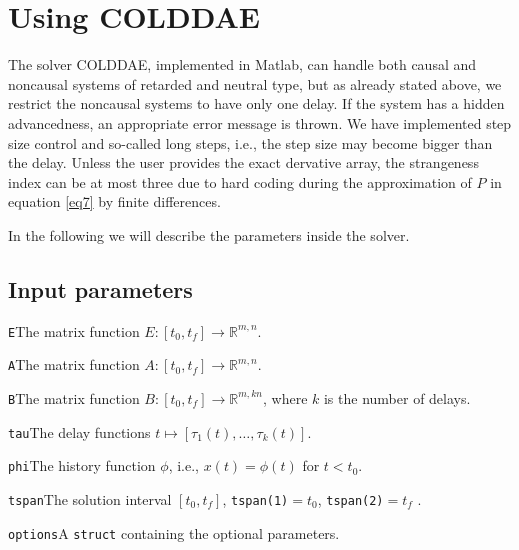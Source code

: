\documentclass[final,reqno]{siamltex}
\renewenvironment{itemize}[1]{\begin{compactitem}#1}{\end{compactitem}}
\begin{document}
\section{Using COLDDAE}

The solver COLDDAE, implemented in Matlab, can handle both causal and noncausal systems of retarded and neutral type, but as already stated above, we restrict the noncausal systems to have only one delay. If the system has a hidden advancedness, an appropriate error message is thrown.
We have implemented step size control and so-called long steps, i.e.,  the step size may become bigger than the delay. 
Unless the user provides the exact dervative array, the strangeness index can be at most three due to hard coding during the approximation of $P$ in equation \eqref{eq7} by finite differences.

In the following we will describe the parameters inside the solver.

\subsection{Input parameters}
\begin{itemize}
\item {\tt E}\quad The matrix function $E:[t_0,t_f]\rightarrow \mathbb{R}^{m,n}$.
\item {\tt A}\quad The matrix function $A:[t_0,t_f]\rightarrow \mathbb{R}^{m,n}$.
\item {\tt B}\quad The matrix function $B:[t_0,t_f]\rightarrow \mathbb{R}^{m,kn}$, where $k$ is the number of delays.
\item {\tt tau}\quad  The delay functions $t\mapsto [\tau_1(t),\ldots,\tau_k(t)]$.
\item {\tt phi}\quad The history function $\phi$, i.e.,  $x(t)=\phi(t)$ for $t < t_0$.
\item {\tt tspan}\quad The solution interval $[t_0,t_f]$, {\tt tspan(1)}$ = t_0$, {\tt tspan(2)}$ = t_f$ .
\item {\tt options}\quad A {\tt struct} containing the optional parameters.
\end{itemize}
\end{document}
